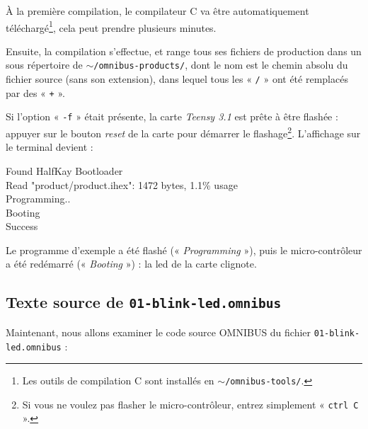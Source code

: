 À la première compilation, le compilateur C va être automatiquement téléchargé\footnote{Les outils de compilation C sont installés en \texttt{$\sim$/omnibus-tools/}.}, cela peut prendre plusieurs minutes.

Ensuite, la compilation s'effectue, et range tous ses fichiers de production dans un sous répertoire de \texttt{$\sim$/omnibus-products/}, dont le nom est le chemin absolu du fichier source (sans son extension), dans lequel tous les « \texttt{/} » ont été remplacés par des « \texttt{+} ».

Si l'option « \texttt{-f} » était présente, la carte \emph{Teensy 3.1} est prête à être flashée : appuyer sur le bouton \emph{reset} de la carte pour démarrer le flashage\footnote{Si vous ne voulez pas flasher le micro-contrôleur, entrez simplement « \texttt{ctrl~C} ».}. L'affichage sur le terminal devient :
\begin{SHELL}
Found HalfKay Bootloader\\
Read "product/product.ihex": 1472 bytes, 1.1\% usage\\
Programming..\\
Booting\\
Success
\end{SHELL}

Le programme d'exemple a été flashé (« \emph{Programming} »), puis le micro-contrôleur a été redémarré (« \emph{Booting} ») : la led de la carte clignote.

\subsection{Texte source de \texttt{01-blink-led.omnibus}}

Maintenant, nous allons examiner le code source OMNIBUS du fichier \texttt{01-blink-led.omnibus} :

